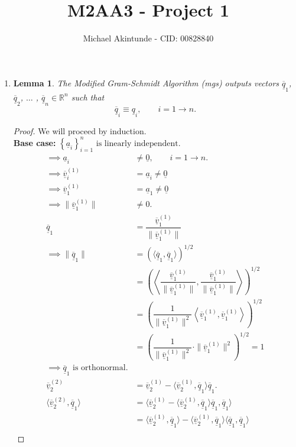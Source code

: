 \documentclass{article}
\newcommand{\mgs}[1] {\underline{\overline{#1}}}
\newcommand{\cgs}[1] {\underline{#1}}
\newtheorem{theorem}{Lemma}
\begin{document}
\title{M2AA3 - Project 1}
\author{Michael Akintunde - CID: 00828840}

\maketitle

\begin{enumerate}
	\item 
	\begin{theorem}
	The Modified Gram-Schmidt Algorithm (mgs) outputs vectors $\mgs{q}_1$, $\mgs{q}_2$, $\ldots$ , $\mgs{q}_n \in \mathbb{R}^n$ such that $$\mgs{q}_i \equiv \cgs{q}_i, \qquad i = 1 \rightarrow n.$$
	\end{theorem}
	\begin{proof}
	We will proceed by induction.\\
	\textbf{Base case:}
	$\left\{ \cgs{a}_i \right\}_{i=1}^n \text{ is linearly independent.}$
	\begin{align*}
		\implies \cgs{a}_i &\neq \underline{0} , \qquad i = 1 \rightarrow n. \\
		\implies \mgs{v}_i^{(1)} &= \cgs{a}_i \neq \underline{0} \\
		\implies \mgs{v}_1^{(1)} &= \cgs{a}_1 \neq \underline{0} \\
		\implies \|\mgs{v}_1^{(1)}\| &\neq 0. \\
		\mgs{q}_1 &= \dfrac{\mgs{v}_1^{(1)}}{\|\mgs{v}_1^{(1)}\|} \\
		\implies \|\mgs{q}_1\| &= \left( \langle \mgs{q}_1 , \mgs{q}_1 \rangle \right)^{1/2}	\\
		&= \left( \left\langle \dfrac{\mgs{v}_1^{(1)}}{\|\mgs{v}_1^{(1)}\|} , \dfrac{\mgs{v}_1^{(1)}}{\|\mgs{v}_1^{(1)}\|} \right\rangle \right)^{1/2} \\
		&= \left( \dfrac{1}{\|\mgs{v}_1^{(1)}\|^2} \left\langle \mgs{v}_1^{(1)} , \mgs{v}_1^{(1)} \right\rangle \right)^{1/2} \\
		&= \left( \dfrac{1}{\|\mgs{v}_1^{(1)}\|^2} \cdot  \|\mgs{v}_1^{(1)}\|^2 \right)^{1/2} = 1 \\
		\implies \mgs{q}_1 \text{ is orthonormal}.\\
		\mgs{v}_2^{(2)} &= \mgs{v}_2^{(1)} - \langle \mgs{v}_2^{(1)}, \mgs{q}_1 \rangle \mgs{q}_1. \\
		\langle \mgs{v}_2^{(2)}, \mgs{q}_1 \rangle 
		&= \langle \mgs{v}_2^{(1)} - \langle \mgs{v}_2^{(1)}, \mgs{q}_1 \rangle \mgs{q}_1, \mgs{q}_1 \rangle \\
		&= \langle \mgs{v}_2^{(1)}, \mgs{q}_1 \rangle - \langle \mgs{v}_2^{(1)}, \mgs{q}_1 \rangle \langle \mgs{q}_1, \mgs{q}_1 \rangle \\

\end{align*}
\end{proof}
\end{enumerate}
\end{document}
